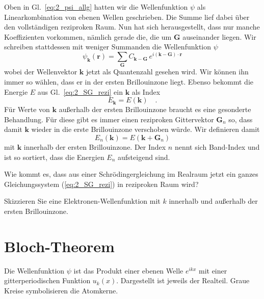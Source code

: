 Oben in Gl.~\ref{eq:2_psi_allg} hatten wir die Wellenfunktion $\psi$ als Linearkombination von ebenen Wellen geschrieben. Die Summe lief dabei über den vollständigen  reziproken Raum.
Nun hat sich herausgestellt, dass nur manche Koeffizienten vorkommen, nämlich gerade die, die um $\mathbf{G}$ auseinander liegen.  Wir schreiben stattdessen mit weniger Summanden die Wellenfunktion $\psi$ 
\begin{equation}
    \psi_\mathbf{k}(\mathbf{r}) =  \sum_{\mathbf{G}} C_{\mathbf{k}-\mathbf{G}} \, e^{i (\mathbf{k}- \mathbf{G}) \cdot \mathbf{r} } 
\end{equation}
wobei der Wellenvektor $\mathbf{k}$ jetzt als Quantenzahl gesehen wird. Wir können ihn immer so wählen, dass er in der ersten Brillouinzone liegt. Ebenso bekommt die Energie $E$ aus Gl.~\ref{eq:2_SG_rezi} ein   $\mathbf{k}$ als Index
\begin{equation}
    E_\mathbf{k} = E(\mathbf{k}) \quad .
\end{equation}
Für Werte von  $\mathbf{k}$ außerhalb der ersten Brillouinzone braucht es eine gesonderte Behandlung. Für diese gibt es immer einen  reziproken Gittervektor $\mathbf{G}_n$ so, dass damit $\mathbf{k}$ wieder in die erste Brillouinzone verschoben würde. Wir definieren damit
\begin{equation}
    E_n(\mathbf{k}) = E(\mathbf{k} + \mathbf{G}_n)
\end{equation}
mit $\mathbf{k}$ innerhalb der ersten Brillouinzone.
Der Index  $n$ nennt sich Band-Index und ist so sortiert, dass die Energien $E_n$ aufsteigend sind.

\begin{questions}
    \item Wie kommt es, dass aus einer Schrödingergleichung im Realraum jetzt ein ganzes Gleichungssystem (\ref{eq:2_SG_rezi}) in reziproken Raum wird?
    \item Skizzieren Sie eine Elektronen-Wellenfunktion mit $k$ innerhalb und außerhalb der ersten Brillouinzone.
\end{questions}


\section{Bloch-Theorem}

\begin{marginfigure}
    \caption{Die Wellenfunktion $\psi$ ist das Produkt einer ebenen Welle $e^{i k x}$ mit einer gitterperiodischen Funktion $u_k(x)$. Dargestellt ist jeweils der Realteil. Graue Kreise symbolisieren die Atomkerne. }
\end{marginfigure}


